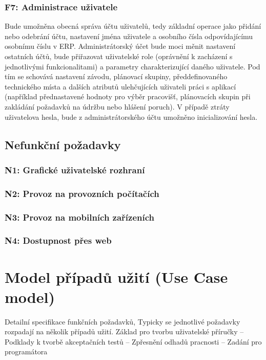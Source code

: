 \documentclass[thesis=M,czech]{FITthesis}[2012/06/26]
\begin{document}
\subsubsection{F7: Administrace uživatele}
Bude umožněna obecná správa účtu uživatelů, tedy základní operace jako přidání nebo odebrání účtu, nastavení jména uživatele a osobního čísla odpovídajícímu osobnímu číslu v ERP. Administrátorský účet bude moci měnit nastavení ostatních účtů, bude přiřazovat uživatelské role (oprávnění k zacházení s jednotlivými funkcionalitami) a parametry charakterizující daného uživatele. Pod tím se schovává nastavení závodu, plánovací skupiny, předdefinovaného technického místa a dalších atributů ulehčujících uživateli práci s aplikací (například přednastavené hodnoty pro výběr pracovišť, plánovacích skupin při zakládání požadavků na údržbu nebo hlášení poruch). V případě ztráty uživatelova hesla, bude z administrátorského účtu umožněno inicializování hesla.


\subsection{Nefunkční požadavky}

\subsubsection{N1: Grafické uživatelské rozhraní}
\subsubsection{N2: Provoz na provozních počítačích}
\subsubsection{N3: Provoz na mobilních zařízeních}
\subsubsection{N4: Dostupnost přes web}

\section{Model případů užití (Use Case model)}
Detailní specifikace funkčních požadavků, Typicky se jednotlivé požadavky rozpadají na několik případů užití. Základ pro tvorbu uživatelské příručky
– Podklady k tvorbě akceptačních testů
– Zpřesnění odhadů pracnosti
– Zadání pro programátora
\end{document}
